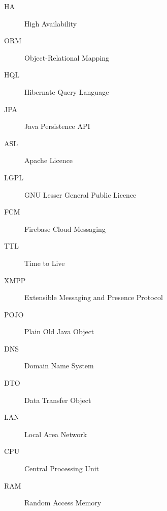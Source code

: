 \begin{description}
        \item[HA] High Availability
        \item[ORM] Object-Relational Mapping
        \item[HQL] Hibernate Query Language
        \item[JPA] Java Persistence API
        \item[ASL] Apache Licence
        \item[LGPL] GNU Lesser General Public Licence
        \item[FCM] Firebase Cloud Messaging
        \item[TTL] Time to Live
        \item[XMPP] Extensible Messaging and Presence Protocol
        \item[POJO] Plain Old Java Object
        \item[DNS] Domain Name System
        \item[DTO] Data Transfer Object
        \item[LAN] Local Area Network
        \item[CPU] Central Processing Unit
        \item[RAM] Random Access Memory
\end{description}
	